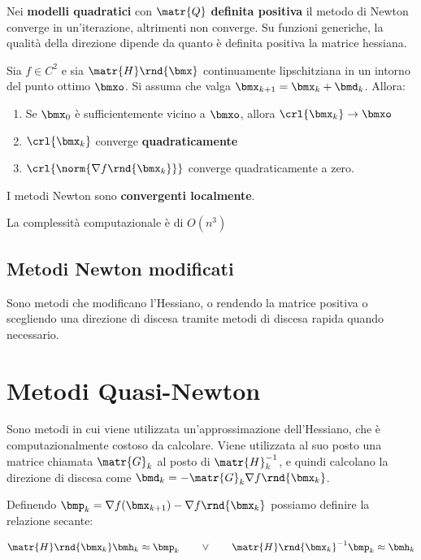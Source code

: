 \documentclass[\main/main.tex]{subfiles}
\begin{document}
Nei \textbf{modelli quadratici} con \(\matr{Q}\) \textbf{definita positiva} il metodo di Newton converge in un'iterazione, altrimenti non converge. Su funzioni generiche, la qualità della direzione dipende da quanto è definita positiva la matrice hessiana.

\begin{theorem}
    Sia \(f \in C^2\) e sia \(\matr{H}\rnd{\bmx}\) continuamente lipschitziana in un intorno del punto ottimo \(\bmxo \). Si assuma che valga \(\bmx_{k+1} = \bmx_k + \bmd_k\). Allora:
    \begin{enumerate}
        \item Se \(\bmx_0\) è sufficientemente vicino a \(\bmxo \), allora \(\crl{\bmx_k} \rightarrow \bmxo \)
        \item \(\crl{\bmx_k}\) converge \textbf{quadraticamente}
        \item \(\crl{\norm{\nabla f\rnd{\bmx_k}}}\) converge quadraticamente a zero.
    \end{enumerate}
    I metodi Newton sono \textbf{convergenti localmente}.
\end{theorem}

La complessità computazionale è di \(O(n^3)\)

\subsection{Metodi Newton modificati}
Sono metodi che modificano l'Hessiano, o rendendo la matrice positiva o scegliendo una direzione di discesa tramite metodi di discesa rapida quando necessario.

\clearpage
\section{Metodi Quasi-Newton}
Sono metodi in cui viene utilizzata un'approssimazione dell'Hessiano, che è computazionalmente costoso da calcolare. Viene utilizzata al suo posto una matrice chiamata \(\matr{G}_k\) al posto di \(\matr{H}_k^{-1}\), e quindi calcolano la direzione di discesa come \(\bmd_k = -\matr{G}_k \nabla f\rnd{\bmx_k}\).

\begin{definition}
    Definendo \(\bmp_k = \nabla f(\bmx_{k+1}) - \nabla f\rnd{\bmx_k}\) possiamo definire la relazione secante:

    \[
        \matr{H}\rnd{\bmx_k}\bmh_k \approx \bmp_k \qquad \lor \qquad {\matr{H}\rnd{\bmx_k}}^{-1}\bmp_k \approx \bmh_k
    \]\end{definition}
\end{document}
